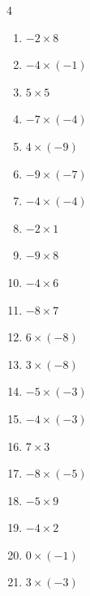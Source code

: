 \begin{multicols}{4}
\begin{enumerate}
  \item $-2\times 8$
        \phantom{$=-16$}

  \item $-4\times (-1)$
        \phantom{$=4$}

  \item $5\times 5$
        \phantom{$=25$}

  \item $-7\times (-4)$
        \phantom{$=28$}

  \item $4\times (-9)$
        \phantom{$=-36$}

  \item $-9\times (-7)$
        \phantom{$=63$}

  \item $-4\times (-4)$
        \phantom{$=16$}

  \item $-2\times 1$
        \phantom{$=-2$}

  \item $-9\times 8$
        \phantom{$=-72$}

  \item $-4\times 6$
        \phantom{$=-24$}

  \item $-8\times 7$
        \phantom{$=-56$}

  \item $6\times (-8)$
        \phantom{$=-48$}

  \item $3\times (-8)$
        \phantom{$=-24$}

  \item $-5\times (-3)$
        \phantom{$=15$}

  \item $-4\times (-3)$
        \phantom{$=12$}

  \item $7\times 3$
        \phantom{$=21$}

  \item $-8\times (-5)$
        \phantom{$=40$}

  \item $-5\times 9$
        \phantom{$=-45$}

  \item $-4\times 2$
        \phantom{$=-8$}

  \item $0\times (-1)$
        \phantom{$=0$}

  \item $3\times (-3)$
        \phantom{$=-9$}


\end{enumerate}
\end{multicols}
